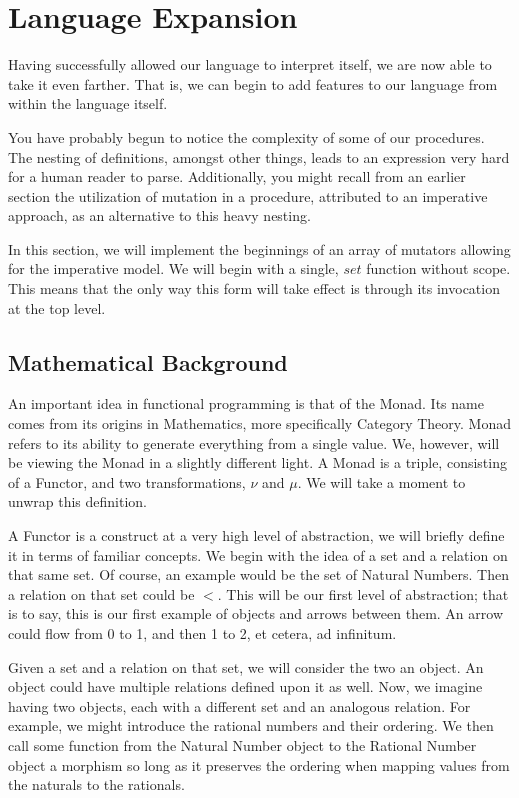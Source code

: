 \section{Language Expansion}
Having successfully allowed our language to interpret itself, we are now able
to take it even farther. That is, we can begin to add features to our
language from within the language itself.

You have probably begun to notice the complexity of some of our procedures.
The nesting of definitions, amongst other things, leads to an expression very
hard for a human reader to parse. Additionally, you might recall from an
earlier section the utilization of mutation in a procedure, attributed to an
imperative approach, as an alternative to this heavy nesting.

In this section, we will implement the beginnings of an array of mutators
allowing for the imperative model. We will begin with a single, $set$ 
function without scope. This means that the only way this form will take
effect is through its invocation at the top level.

\subsection{Mathematical Background}
An important idea in functional programming is that of the Monad. Its name
comes from its origins in Mathematics, more specifically Category Theory.
Monad refers to its ability to generate everything from a single value. We,
however, will be viewing the Monad in a slightly different light. A Monad
is a triple, consisting of a Functor, and two transformations, $\nu$ and 
$\mu$. We will take a moment to unwrap this definition.

A Functor is a construct at a very high level of abstraction, we will briefly
define it in terms of familiar concepts. We begin with the idea of a set and
a relation on that same set. Of course, an example would be the set of Natural
Numbers. Then a relation on that set could be $<$. This will be our first
level of abstraction; that is to say, this is our first example of objects and
arrows between them. An arrow could flow from 0 to 1, and then 1 to 2, et cetera,
ad infinitum.

Given a set and a relation on that set, we will consider the two an object. An
object could have multiple relations defined upon it as well. Now, we imagine
having two objects, each with a different set and an analogous relation. For example,
we might introduce the rational numbers and their ordering. We then call some
function from the Natural Number object to the Rational Number object a morphism
so long as it preserves the ordering when mapping values from the naturals to
the rationals.

